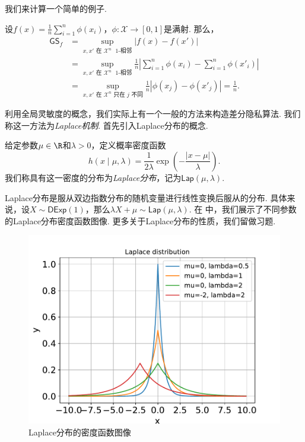 我们来计算一个简单的例子.
\begin{example}
设$f(x)= \frac1n \sum_{i=1}^n \phi(x_i)$，$\phi : \mathcal X\to [0,1]$是满射. 那么，
\begin{align*}
    \mathsf{GS}_f&=\sup_{x, x' \text{ 在 }\mathcal X^n\text{ $1$-相邻}} |f(x) - f(x')|\\
    &= \sup_{x, x' \text{ 在 }\mathcal X^n\text{ $1$-相邻}} \frac1n \left|\sum_{i=1}^n \phi(x_i) - \sum_{i=1}^n \phi(x'_i)\right|\\
    &= \sup_{x, x' \text{ 在 }\mathcal X^n\text{ 只在 } j\text{ 不同}} \frac1n \left|\phi(x_j) - \phi(x'_j)\right| = \frac1n.
\end{align*}
\end{example}

利用全局灵敏度的概念，我们实际上有一个一般的方法来构造差分隐私算法. 我们称这一方法为\emph{Laplace机制}. 首先引入Laplace分布的概念.

\begin{definition}[Laplace分布]
    给定参数$\mu\in\R$和$\lambda>0$，定义概率密度函数
        \[h(x \mid \mu, \lambda) = \frac1{2\lambda}\exp\left(- \frac{|x - \mu|}{\lambda}\right).\]
我们称具有这一密度的分布为\emph{Laplace分布}，记为$\mathsf{Lap}(\mu,\lambda)$.
\end{definition}

Laplace分布是服从双边指数分布的随机变量进行线性变换后服从的分布. 具体来说，设$X\sim\mathsf{DExp}(1)$，那么$\lambda X+\mu\sim\mathsf{Lap}(\mu,\lambda)$. 在 中，我们展示了不同参数的Laplace分布密度函数图像. 更多关于Laplace分布的性质，我们留做习题. 

\begin{figure}[ht]
    \centering
    \includegraphics[scale=0.6]{Figures/differential-privacy/LaplaceDist.pdf}
    
    \caption{Laplace分布的密度函数图像}
    \label{fig:Laplace-distribution}
\end{figure}

